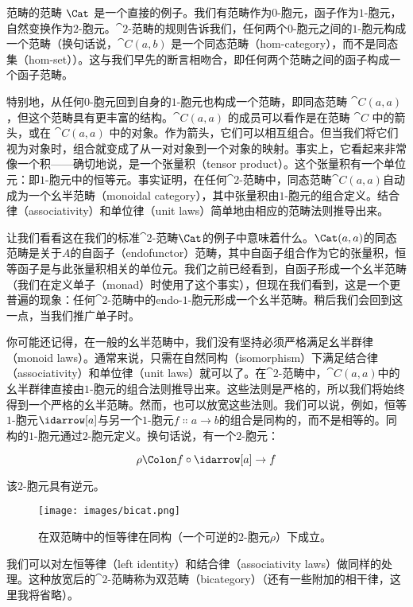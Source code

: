 \noindent
范畴的范畴 $\Cat$ 是一个直接的例子。我们有范畴作为$0$-胞元，函子作为$1$-胞元，自然变换作为$2$-胞元。$\cat{2}$-范畴的规则告诉我们，任何两个$0$-胞元之间的$1$-胞元构成一个范畴（换句话说，$\cat{C}(a, b)$ 是一个同态范畴（hom-category），而不是同态集（hom-set））。这与我们早先的断言相吻合，即任何两个范畴之间的函子构成一个函子范畴。

特别地，从任何$0$-胞元回到自身的$1$-胞元也构成一个范畴，即同态范畴 $\cat{C}(a, a)$，但这个范畴具有更丰富的结构。$\cat{C}(a, a)$ 的成员可以看作是在范畴 $\cat{C}$ 中的箭头，或在 $\cat{C}(a, a)$ 中的对象。作为箭头，它们可以相互组合。但当我们将它们视为对象时，组合就变成了从一对对象到一个对象的映射。事实上，它看起来非常像一个积——确切地说，是一个张量积（tensor product）。这个张量积有一个单位元：即$1$-胞元中的恒等元。事实证明，在任何$\cat{2}$-范畴中，同态范畴$\cat{C}(a, a)$自动成为一个幺半范畴（monoidal category），其中张量积由$1$-胞元的组合定义。结合律（associativity）和单位律（unit laws）简单地由相应的范畴法则推导出来。

让我们看看这在我们的标准$\cat{2}$-范畴$\Cat$的例子中意味着什么。$\Cat(a, a)$的同态范畴是关于$A$的自函子（endofunctor）范畴，其中自函子组合作为它的张量积，恒等函子是与此张量积相关的单位元。我们之前已经看到，自函子形成一个幺半范畴（我们在定义单子（monad）时使用了这个事实），但现在我们看到，这是一个更普遍的现象：任何$\cat{2}$-范畴中的endo-$1$-胞元形成一个幺半范畴。稍后我们会回到这一点，当我们推广单子时。

你可能还记得，在一般的幺半范畴中，我们没有坚持必须严格满足幺半群律（monoid laws）。通常来说，只需在自然同构（isomorphism）下满足结合律（associativity）和单位律（unit laws）就可以了。在$\cat{2}$-范畴中，$\cat{C}(a, a)$中的幺半群律直接由$1$-胞元的组合法则推导出来。这些法则是严格的，所以我们将始终得到一个严格的幺半范畴。然而，也可以放宽这些法则。我们可以说，例如，恒等$1$-胞元$\idarrow[a]$与另一个$1$-胞元$f \Colon a \to b$的组合是同构的，而不是相等的。同构的$1$-胞元通过$2$-胞元定义。换句话说，有一个$2$-胞元：

$$\rho \Colon f \circ \idarrow[a] \to f$$

该$2$-胞元具有逆元。

\begin{figure}[H]
  \centering
  \texttt{[image: images/bicat.png]}
  \caption{在双范畴中的恒等律在同构（一个可逆的$2$-胞元$\rho$）下成立。}
\end{figure}

\noindent
我们可以对左恒等律（left identity）和结合律（associativity laws）做同样的处理。这种放宽后的$\cat{2}$-范畴称为双范畴（bicategory）（还有一些附加的相干律，这里我将省略）。

